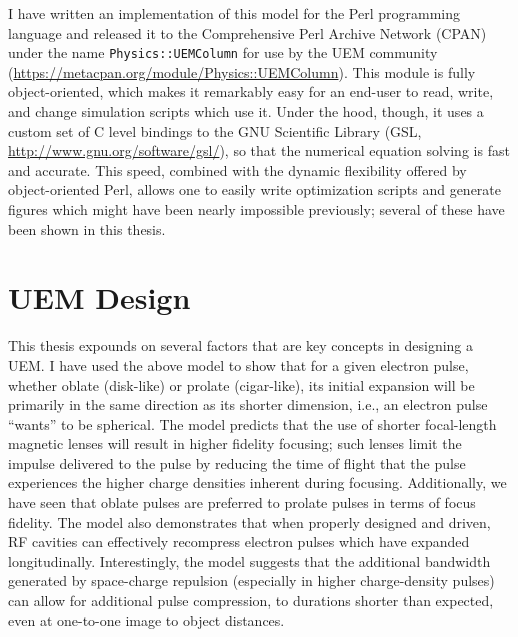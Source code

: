 I have written an implementation of this model for the Perl programming language and released it to the Comprehensive Perl Archive Network (CPAN) under the name \verb!Physics::UEMColumn! for use by the UEM community (\url{https://metacpan.org/module/Physics::UEMColumn}).
This module is fully object-oriented, which makes it remarkably easy for an end-user to read, write, and change simulation scripts which use it.
Under the hood, though, it uses a custom set of C level bindings to the GNU Scientific Library (GSL, \url{http://www.gnu.org/software/gsl/}), so that the numerical equation solving is fast and accurate.
This speed, combined with the dynamic flexibility offered by object-oriented Perl, allows one to easily write optimization scripts and generate figures which might have been nearly impossible previously; several of these have been shown in this thesis.

\section{UEM Design}

This thesis expounds on several factors that are key concepts in designing a UEM.
I have used the above model to show that for a given electron pulse, whether oblate (disk-like) or prolate (cigar-like), its initial expansion will be primarily in the same direction as its shorter dimension, i.e., an electron pulse ``wants'' to be spherical.
The model predicts that the use of shorter focal-length magnetic lenses will result in higher fidelity focusing; such lenses limit the impulse delivered to the pulse by reducing the time of flight that the pulse experiences the higher charge densities inherent during focusing.
Additionally, we have seen that oblate pulses are preferred to prolate pulses in terms of focus fidelity.
The model also demonstrates that when properly designed and driven, RF cavities can effectively recompress electron pulses which have expanded longitudinally.
Interestingly, the model suggests that the additional bandwidth generated by space-charge repulsion (especially in higher charge-density pulses) can allow for additional pulse compression, to durations shorter than expected, even at one-to-one image to object distances.

